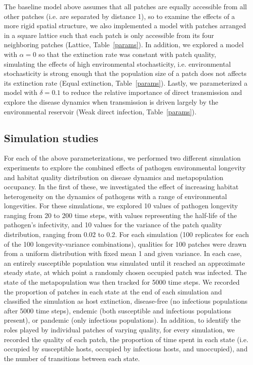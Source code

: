 \documentclass{svjour3}
\begin{document}
The baseline model above assumes that all patches are equally accessible from all other patches (i.e. are separated by distance 1), so to examine the effects of a more rigid spatial structure, we also implemented a model with patches arranged in a square lattice such that each patch is only accessible from its four neighboring patches (Lattice, Table~\ref{params}).  In addition, we explored a model with $\alpha = 0$ so that the extinction rate was constant with patch quality, simulating the effects of high environmental stochasticity, i.e. environmental stochasticity is strong enough that the population size of a patch does not affects its extinction rate (Equal extinction, Table~\ref{params}).  Lastly, we parameterized a model with $\delta = 0.1$ to reduce the relative importance of direct transmission and explore the disease dynamics when transmission is driven largely by the environmental reservoir (Weak direct infection, Table~\ref{params}). 

\subsection{Simulation studies}

For each of the above parameterizations, we performed two different simulation experiments to explore the combined effects of pathogen environmental longevity and habitat quality distribution on disease dynamics and metapopulation occupancy.  In the first of these, we investigated the effect of increasing habitat heterogeneity on the dynamics of pathogens with a range of environmental longevities.  For these simulations, we explored 10 values of pathogen longevity ranging from 20 to 200 time steps, with values representing the half-life of the pathogen's infectivity, and 10 values for the variance of the patch quality distribution, ranging from 0.02 to 0.2.  For each simulation (100 replicates for each of the 100 longevity-variance combinations), qualities for 100 patches were drawn from a uniform distribution with fixed mean 1 and given variance. In each case, an entirely susceptible population was simulated until it reached an approximate steady state, at which point a randomly chosen occupied patch was infected.  The state of the metapopulation was then tracked for 5000 time steps.  We recorded the proportion of patches in each state at the end of each simulation and classified the simulation as host extinction, disease-free (no infectious populations after 5000 time steps), endemic (both susceptible and infectious populations present), or pandemic (only infectious populations).  In addition, to identify the roles played by individual patches of varying quality, for every simulation, we recorded the quality of each patch, the proportion of time spent in each state (i.e. occupied by susceptible hosts, occupied by infectious hosts, and unoccupied), and the number of transitions between each state.  
\end{document}
